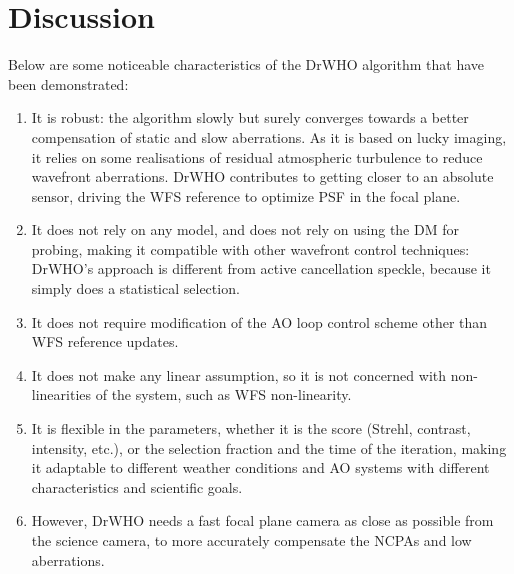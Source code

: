 \documentclass[twocolumn]{aa}
\newcommand{\nour}[1]{\textcolor{teal}{#1}}
\begin{document}
\section{Discussion}\label{sec:Discussion}
Below are some noticeable characteristics of the DrWHO algorithm that have been demonstrated: 
\begin{enumerate}
    \item It is robust: the algorithm slowly but surely converges towards a better compensation of static and slow aberrations. As it is based on lucky imaging, it relies on some realisations of residual atmospheric turbulence to reduce wavefront aberrations. DrWHO contributes to getting closer to an absolute sensor, driving the WFS reference to optimize PSF in the focal plane.
    \item It does not rely on any model, and does not rely on using the DM for probing, making it compatible with other wavefront control techniques: DrWHO's approach is different from active cancellation speckle, because it simply does a statistical selection.
    \item It does not require modification of the AO loop control scheme other than WFS reference updates.
    \item It does not make any linear assumption, so it is not concerned with non-linearities of the system, such as WFS non-linearity.
    \item It is flexible in the parameters, whether it is the score (Strehl, contrast, intensity, etc.), or the selection fraction and the time of the iteration, making it adaptable to different weather conditions and AO systems with different characteristics and scientific goals.
    \item However, DrWHO needs a fast focal plane camera as close as possible from the science camera, to more accurately compensate the NCPAs and low aberrations. 
    
\end{enumerate}
\end{document}
